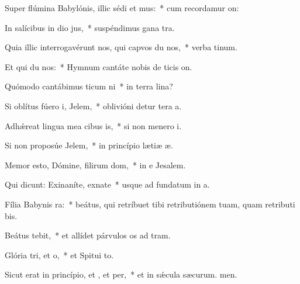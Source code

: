 \item Super flúmina Babylónis, illic sédi et mus:~* cum recordamur on:
\item In salícibus in dio jus,~* suspéndimus gana tra.
\item Quia illic interrogavérunt nos, qui capvos du nos,~* verba tinum.
\item Et qui du nos:~* Hymnum cantáte nobis de ticis on.
\item Quómodo cantábimus ticum ni~* in terra lina?
\item Si oblítus fúero i, Jelem,~* oblivióni detur tera a.
\item Adhǽreat lingua mea cibus is,~* si non menero i.
\item Si non proposúe Jelem,~* in princípio lætiæ æ.
\item Memor esto, Dómine, filirum dom,~* in e Jesalem.
\item Qui dicunt: Exinaníte, exnate~* usque ad fundatum in a.
\item Fília Babynis ra:~* beátus, qui retríbuet tibi retributiónem tuam, quam retributi bis.
\item Beátus  tebit,~* et allídet párvulos os ad tram.
\item Glória tri, et o,~* et Spitui to.
\item Sicut erat in princípio, et , et per,~* et in sǽcula sæcurum. men.
